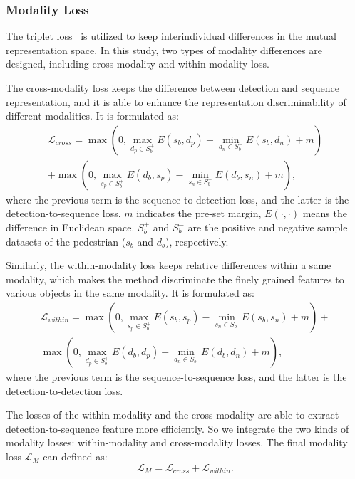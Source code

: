 \documentclass[times,twocolumn,final,authoryear]{elsarticle}
\begin{document}
\subsubsection{Modality Loss}
The triplet loss~\citep{cheng2016person} is utilized to keep interindividual differences in the mutual representation space.
In this study, two types of modality differences are designed, including cross-modality and within-modality loss.

The cross-modality loss keeps the difference between detection and sequence representation, and it is able to enhance the representation discriminability of different modalities. 
It is formulated as:
\begin{equation}\label{eq:I2Sloss}
\begin{aligned}
\mathcal{L}_{cross} = \max (0, \max_{d_p\in S_b^+} E(s_b, d_p) - \min_{d_n\in S_b^-} E(s_b, d_n) + m) \\
+ \max(0, \max_{s_p\in S_b^+} E(d_b, s_p) - \min_{s_n\in S_b^-} E(d_b, s_n) + m ),
\end{aligned}
\end{equation}
where the previous term is the sequence-to-detection loss, and the latter is the detection-to-sequence loss.
$m$ indicates the pre-set margin, $E(\cdot,\cdot)$ means the difference in Euclidean space.
$S_b^+$ and $S_b^-$ are the positive and negative sample datasets of the pedestrian ($s_b$ and $d_b$), respectively. 

Similarly, the within-modality loss keeps relative differences within a same modality, which makes the method discriminate the finely grained features to various objects in the same modality. 
It is formulated as:
\begin{equation}\label{eq:I2Iloss}
\begin{aligned}
\mathcal{L}_{within}= \max(0, \max_{s_p\in S_b^+} E(s_b, s_p) - \min_{s_n\in S_b^-} E(s_b, s_n) + m ) + \\
\max (0, \max_{d_p\in S_b^+} E(d_b, d_p) - \min_{d_n\in S_b^-} E(d_b, d_n) + m ) ,
\end{aligned}
\end{equation}
where the previous term is the sequence-to-sequence loss, and the latter is the detection-to-detection loss.

The losses of the within-modality and the cross-modality are able to extract detection-to-sequence feature more efficiently.
So we integrate the two kinds of modality losses: within-modality and cross-modality losses.
The final modality loss $\mathcal{L}_{M}$ can defined as:
\begin{equation}\label{eq:tripletloss}
\mathcal{L}_{M}= \mathcal{L}_{cross}+\mathcal{L}_{within}.
\end{equation}
\end{document}

